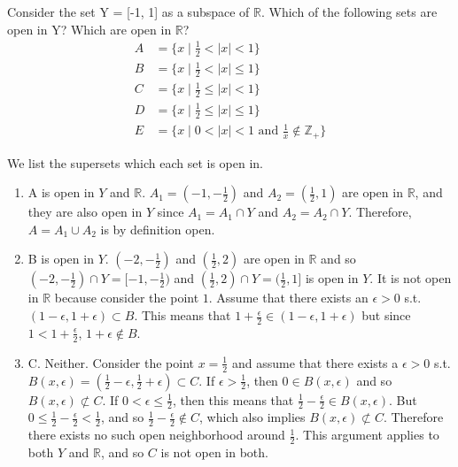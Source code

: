   \begin{exercise}[Munkres 16.3]
    Consider the set Y = [-1, 1] as a subspace of $\mathbb{R}$. Which of the following sets are open in Y? Which are open in $\mathbb{R}$?
    \begin{align}
      A & = \{x \mid \frac{1}{2} < |x| < 1\} \\
      B & = \{x \mid \frac{1}{2} < |x| \leq 1\} \\
      C & = \{x \mid \frac{1}{2} \leq |x| < 1\} \\
      D & = \{x \mid \frac{1}{2} \leq |x| \leq 1\} \\
      E & = \{x \mid 0 < |x| < 1 \text{ and } \frac{1}{x} \notin \mathbb{Z}_+\}
    \end{align}
  \end{exercise}
  \begin{solution}[Munkres 16.3]
    We list the supersets which each set is open in. 
    \begin{enumerate}
      \item A is open in $Y$ and $\mathbb{R}$. $A_1 = (-1, -\frac{1}{2})$ and $A_2 = (\frac{1}{2}, 1)$ are open in $\mathbb{R}$, and they are also open in $Y$ since $A_1 = A_1 \cap Y$ and $A_2 = A_2 \cap Y$. Therefore, $A = A_1 \cup A_2$ is by definition open. 

      \item B is open in $Y$. $(-2, -\frac{1}{2})$ and $(\frac{1}{2}, 2)$ are open in $\mathbb{R}$ and so $(-2, -\frac{1}{2}) \cap Y = [-1, -\frac{1}{2})$ and $(\frac{1}{2}, 2) \cap Y = (\frac{1}{2}, 1]$ is open in $Y$. It is not open in $\mathbb{R}$ because consider the point $1$. Assume that there exists an $\epsilon > 0$ s.t. $(1 - \epsilon, 1 + \epsilon) \subset B$. This means that $1 + \frac{\epsilon}{2} \in (1 - \epsilon, 1 + \epsilon)$ but since $1 < 1 + \frac{\epsilon}{2}$, $1 + \epsilon \not\in B$. 

      \item C. Neither. Consider the point $x = \frac{1}{2}$ and assume that there exists a $\epsilon > 0$ s.t. $B(x, \epsilon) = (\frac{1}{2} - \epsilon, \frac{1}{2} + \epsilon) \subset C$. If $\epsilon > \frac{1}{2}$, then $0 \in B(x, \epsilon)$ and so $B(x, \epsilon) \not\subset C$. If $0 < \epsilon \leq \frac{1}{2}$, then this means that $\frac{1}{2} - \frac{\epsilon}{2} \in B(x, \epsilon)$. But $0 \leq \frac{1}{2} - \frac{\epsilon}{2} < \frac{1}{2}$, and so $\frac{1}{2} - \frac{\epsilon}{2} \not\in C$, which also implies $B(x, \epsilon) \not\subset C$. Therefore there exists no such open neighborhood around $\frac{1}{2}$. This argument applies to both $Y$ and $\mathbb{R}$, and so $C$ is not open in both. 


\end{enumerate}
\end{solution}
